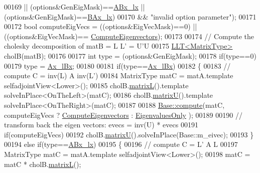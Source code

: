 \begin{DoxyCode}
00169            || (options&GenEigMask)==\hyperlink{group__enums_ggae3e239fb70022eb8747994cf5d68b4a9afc36646eaa4187858eaad466d32a2096}{ABx\_lx} || (options&GenEigMask)==\hyperlink{group__enums_ggae3e239fb70022eb8747994cf5d68b4a9a5b64c528c90483f0b716018cad0143f8}{BAx\_lx})
00170           && \textcolor{stringliteral}{"invalid option parameter"});
00171 
00172   \textcolor{keywordtype}{bool} computeEigVecs = ((options&EigVecMask)==0) || ((options&EigVecMask)==
      \hyperlink{group__enums_ggae3e239fb70022eb8747994cf5d68b4a9ada93d8885bde32b876ba4af01d3292cc}{ComputeEigenvectors});
00173 
00174   \textcolor{comment}{// Compute the cholesky decomposition of matB = L L' = U'U}
00175   \hyperlink{group___cholesky___module_class_eigen_1_1_l_l_t}{LLT<MatrixType>} cholB(matB);
00176 
00177   \textcolor{keywordtype}{int} type = (options&GenEigMask);
00178   \textcolor{keywordflow}{if}(type==0)
00179     type = \hyperlink{group__enums_ggae3e239fb70022eb8747994cf5d68b4a9a1a7cefbb22c2c3928d246b753cf53633}{Ax\_lBx};
00180 
00181   \textcolor{keywordflow}{if}(type==\hyperlink{group__enums_ggae3e239fb70022eb8747994cf5d68b4a9a1a7cefbb22c2c3928d246b753cf53633}{Ax\_lBx})
00182   \{
00183     \textcolor{comment}{// compute C = inv(L) A inv(L')}
00184     MatrixType matC = matA.template selfadjointView<Lower>();
00185     cholB.\hyperlink{group___cholesky___module_a7f4a3eedbf82e7ce2d6bf0dcd84cdfa3}{matrixL}().template solveInPlace<OnTheLeft>(matC);
00186     cholB.\hyperlink{group___cholesky___module_a18a390f085567e650e8345cc7e7c0df8}{matrixU}().template solveInPlace<OnTheRight>(matC);
00187 
00188     \hyperlink{group___eigenvalues___module_a88bcdc24112efa7c4d2ebb3476efcbe9}{Base::compute}(matC, computeEigVecs ? \hyperlink{group__enums_ggae3e239fb70022eb8747994cf5d68b4a9ada93d8885bde32b876ba4af01d3292cc}{ComputeEigenvectors} : 
      \hyperlink{group__enums_ggae3e239fb70022eb8747994cf5d68b4a9ad0c82cf0a9daf2a63bb6e2f10d51f69c}{EigenvaluesOnly} );
00189 
00190     \textcolor{comment}{// transform back the eigen vectors: evecs = inv(U) * evecs}
00191     \textcolor{keywordflow}{if}(computeEigVecs)
00192       cholB.\hyperlink{group___cholesky___module_a18a390f085567e650e8345cc7e7c0df8}{matrixU}().solveInPlace(Base::m\_eivec);
00193   \}
00194   \textcolor{keywordflow}{else} \textcolor{keywordflow}{if}(type==\hyperlink{group__enums_ggae3e239fb70022eb8747994cf5d68b4a9afc36646eaa4187858eaad466d32a2096}{ABx\_lx})
00195   \{
00196     \textcolor{comment}{// compute C = L' A L}
00197     MatrixType matC = matA.template selfadjointView<Lower>();
00198     matC = matC * cholB.\hyperlink{group___cholesky___module_a7f4a3eedbf82e7ce2d6bf0dcd84cdfa3}{matrixL}();

\end{DoxyCode}
